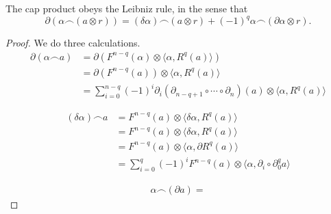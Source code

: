 \documentclass[main.tex]{subfiles}
\begin{document}
\begin{lemma}
  \label{lemma:cap_product_leibniz_rule}
  The cap product obeys the Leibniz rule, in the sense that
  \begin{equation*}
    \partial(\alpha \frown (a \otimes r)) = (\delta \alpha) \frown (a \otimes r) + (-1)^{q} \alpha \frown (\partial \alpha \otimes r).
  \end{equation*}
\end{lemma}
\begin{proof}
  We do three calculations.
  \begin{align*}
    \partial( \alpha \frown a ) &= \partial(F^{n-q}(\alpha) \otimes \langle \alpha, R^{q}(a) \rangle) \\
    &= \partial(F^{n-q}(a)) \otimes \langle \alpha, R^{q}(a) \rangle \\
    &= \sum_{i = 0}^{n-q} (-1)^{i} \partial_{i} (\partial_{n-q+1} \circ \cdots \circ \partial_{n})(a) \otimes\langle \alpha, R^{q}(a) \rangle
  \end{align*}

  \begin{align*}
    (\delta \alpha) \frown a &= F^{n-q}(a) \otimes \langle \delta \alpha, R^{q}(a) \rangle \\
    &= F^{n-q}(a) \otimes \langle \delta \alpha, R^{q}(a) \rangle \\
    &= F^{n-q}(a) \otimes \langle \alpha, \partial R^{q}(a) \rangle \\
    &= \sum_{i = 0}^{q} (-1)^{i} F^{n-q}(a) \otimes \langle \alpha, \partial_{i} \circ \partial_{0}^{q} a \rangle
  \end{align*}

  \begin{align*}
    \alpha \frown (\partial a) =
  \end{align*}
\end{proof}
\end{document}
